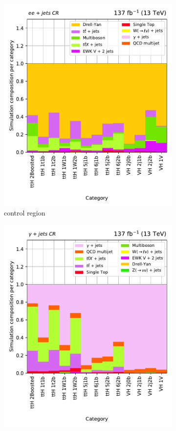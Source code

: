 \begin{figure}[htbp]
\begin{subfigure}[b]{0.32\textwidth}
        \includegraphics[width=\textwidth]{figures/region_plots/full_Run2/region_4/background_composition.pdf}
        \caption{\doubleEleCr control region}
    \end{subfigure}
    \hfill
    \begin{subfigure}[b]{0.32\textwidth}
        \includegraphics[width=\textwidth]{figures/region_plots/full_Run2/region_5/background_composition.pdf}

\end{subfigure}
\end{figure}
